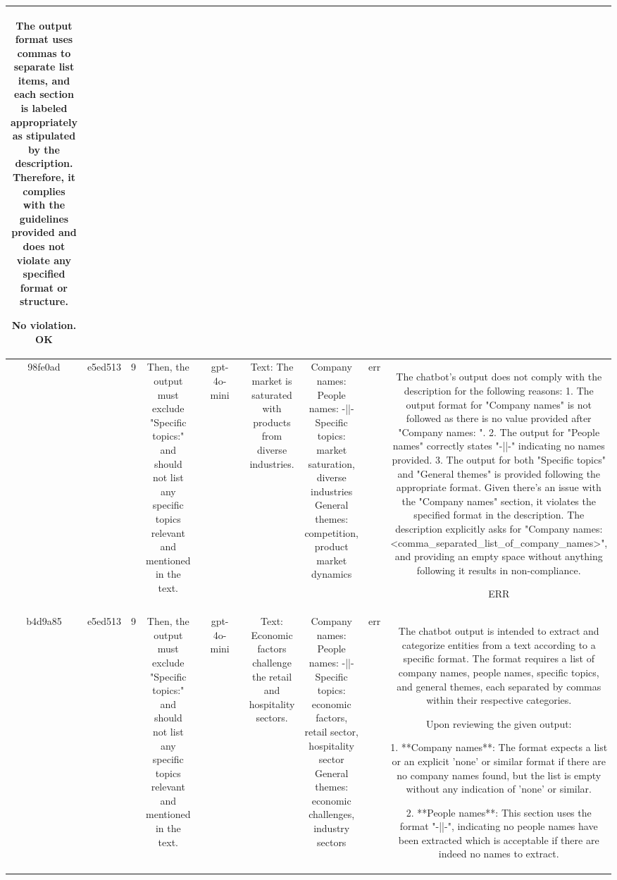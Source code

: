 \begin{table}[h!]
\begin{tabular}{|c|c|c|c|c|c|c|c|c|c|c|}
The output format uses commas to separate list items, and each section is labeled appropriately as stipulated by the description. Therefore, it complies with the guidelines provided and does not violate any specified format or structure.

No violation.
OK\\
\hline
98fe0ad & e5ed513 & 9 & Then, the output must exclude "Specific topics:" and should not list any specific topics relevant and mentioned in the text. &  & gpt-4o-mini &  & Text: The market is saturated with products from diverse industries. & Company names: 
People names: -||-
Specific topics: market saturation, diverse industries
General themes: competition, product market dynamics & err & The chatbot's output does not comply with the description for the following reasons:
1. The output format for "Company names" is not followed as there is no value provided after "Company names: ".
2. The output for "People names" correctly states "-||-" indicating no names provided.
3. The output for both "Specific topics" and "General themes" is provided following the appropriate format.
Given there's an issue with the "Company names" section, it violates the specified format in the description. The description explicitly asks for "Company names: <comma_separated_list_of_company_names>", and providing an empty space without anything following it results in non-compliance.

ERR\\
\hline
b4d9a85 & e5ed513 & 9 & Then, the output must exclude "Specific topics:" and should not list any specific topics relevant and mentioned in the text. &  & gpt-4o-mini &  & Text: Economic factors challenge the retail and hospitality sectors. & Company names: 
People names: -||-
Specific topics: economic factors, retail sector, hospitality sector
General themes: economic challenges, industry sectors & err & The chatbot output is intended to extract and categorize entities from a text according to a specific format. The format requires a list of company names, people names, specific topics, and general themes, each separated by commas within their respective categories.

Upon reviewing the given output:

1. **Company names**: The format expects a list or an explicit 'none' or similar format if there are no company names found, but the list is empty without any indication of 'none' or similar.

2. **People names**: This section uses the format "-||-", indicating no people names have been extracted which is acceptable if there are indeed no names to extract.


\end{tabular}
\end{table}
